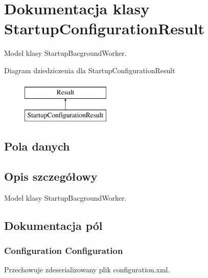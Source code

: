 \hypertarget{a00062}{}\section{Dokumentacja klasy Startup\+Configuration\+Result}
\label{a00062}


Model klasy Startup\+Bacground\+Worker.  


Diagram dziedziczenia dla Startup\+Configuration\+Result\begin{figure}[H]
\begin{center}
\leavevmode
\includegraphics[height=2.000000cm]{df/d03/a00062}
\end{center}
\end{figure}
\subsection*{Pola danych}


\subsection{Opis szczegółowy}
Model klasy Startup\+Bacground\+Worker. 



\subsection{Dokumentacja pól}
\hypertarget{a00062_a79d2ae3a417d1e28a75c8ab7c8843887}{}
\subsubsection[{Configuration}]{\setlength{\rightskip}{0pt plus 5cm}Configuration Configuration}\label{a00062_a79d2ae3a417d1e28a75c8ab7c8843887}


Przechowuje zdeserializowany plik configuration.\+xml. 

